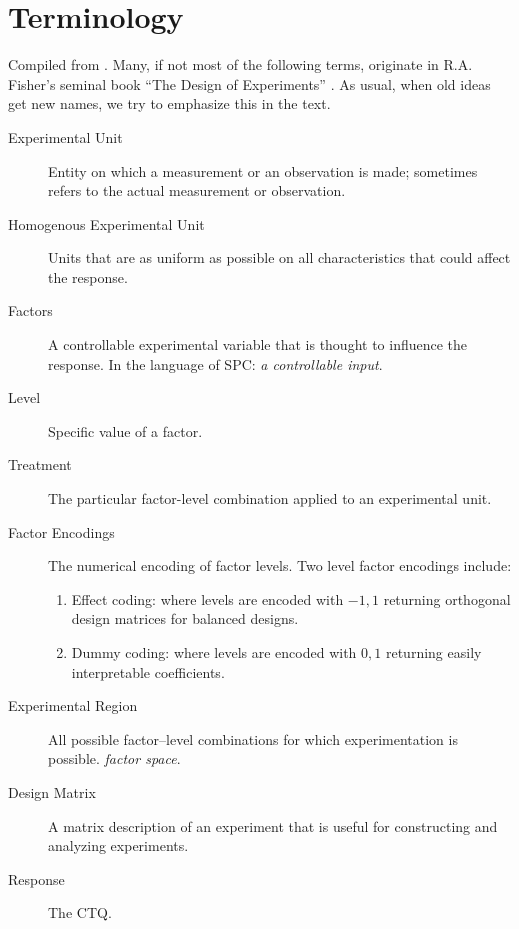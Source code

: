 \section{Terminology}
Compiled from \cite{mason_statistical_2003}. Many, if not most of the following terms, originate in R.A. Fisher's seminal book ``The Design of Experiments'' \citep{fisher_design_1960}. As usual, when old ideas get new names, we try to emphasize this in the text.



\begin{description}

\item [Experimental Unit]  Entity on which a measurement or an observation is made;
sometimes refers to the actual measurement or observation.
\item [Homogenous Experimental Unit] Units that are as uniform as possible on all characteristics that could affect the response.

\item [Factors]  A controllable experimental variable that is thought to influence the response. In the language of SPC: \emph{a controllable input}.

\item [Level] Specific value of a factor.

\item[Treatment] The particular factor-level combination applied to an experimental unit.

\item [Factor Encodings] The numerical encoding of factor levels.
Two level factor encodings include:
\begin{enumerate}
\item Effect coding: where levels are encoded with $-1,1$ returning orthogonal design matrices for balanced designs.
\item Dummy coding: where levels are encoded with $0,1$ returning easily interpretable coefficients.
\end{enumerate}

\item [Experimental Region] All possible factor–level combinations for which experimentation is possible. \Aka \emph{factor space}.

\item [Design Matrix] A matrix description of an experiment that is useful for constructing and analyzing experiments.

\item [Response] The CTQ.


\end{description}
